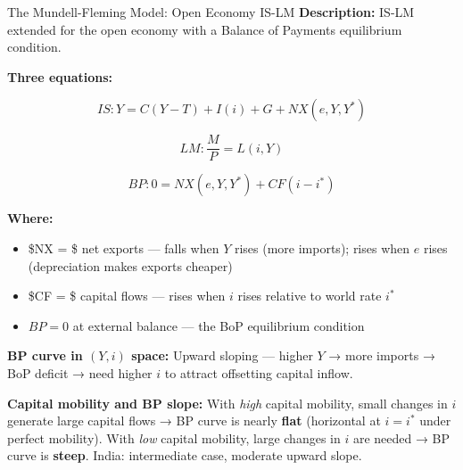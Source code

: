 \documentclass[
  ignorenonframetext,
  aspectratio=169,
]{beamer}
\makeatletter
\providecommand{\tightlist}{%
  \setlength{\itemsep}{0pt}\setlength{\parskip}{0pt}}
\let\quarto@originallabel\label
\DeclareRobustCommand*{\label}[1]{\quarto@originallabel{#1}}
\makeatother
\begin{document}
\begin{frame}{The Mundell-Fleming Model: Open Economy IS-LM}
\label{the-mundell-fleming-model-open-economy-is-lm}
\textbf{Description:} IS-LM extended for the open economy with a Balance
of Payments equilibrium condition.

\textbf{Three equations:}

\[IS: Y = C(Y-T) + I(i) + G + NX(e, Y, Y^*)\]

\[LM: \frac{M}{P} = L(i, Y)\]

\[BP: 0 = NX(e, Y, Y^*) + CF(i - i^*)\]

\textbf{Where:}

\begin{itemize}
\tightlist
\item
  \$NX = \$ net exports --- falls when \(Y\) rises (more imports); rises
  when \(e\) rises (depreciation makes exports cheaper)
\item
  \$CF = \$ capital flows --- rises when \(i\) rises relative to world
  rate \(i^*\)
\item
  \(BP = 0\) at external balance --- the BoP equilibrium condition
\end{itemize}

\textbf{BP curve in \((Y, i)\) space:} Upward sloping --- higher \(Y\) →
more imports → BoP deficit → need higher \(i\) to attract offsetting
capital inflow.

\textbf{Capital mobility and BP slope:} With \emph{high} capital
mobility, small changes in \(i\) generate large capital flows → BP curve
is nearly \textbf{flat} (horizontal at \(i = i^*\) under perfect
mobility). With \emph{low} capital mobility, large changes in \(i\) are
needed → BP curve is \textbf{steep}. India: intermediate case, moderate
upward slope.
\end{frame}
\end{document}
